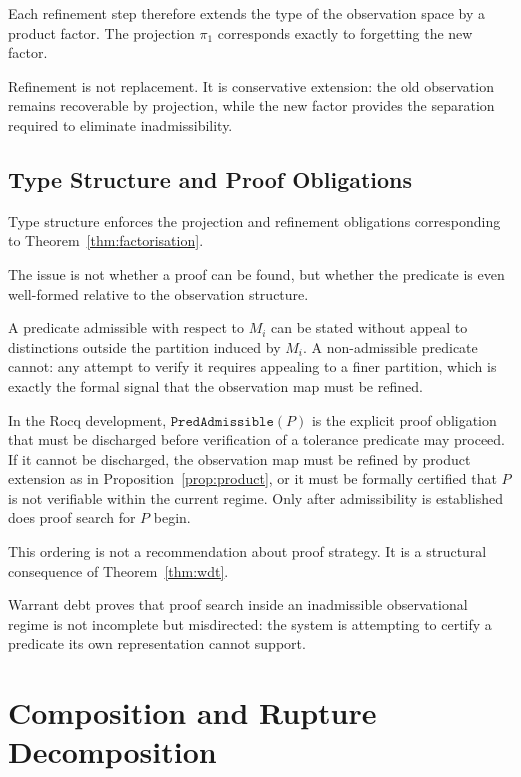 \documentclass[12pt]{article}
\theoremstyle{plain}
\theoremstyle{definition}
\theoremstyle{remark}
\begin{document}
Each refinement step therefore extends the type of the observation
space by a product factor.
The projection $\pi_1$ corresponds exactly to forgetting the new
factor.

Refinement is not replacement.
It is conservative extension: the old observation remains recoverable
by projection, while the new factor provides the separation required
to eliminate inadmissibility.

\subsection{Type Structure and Proof Obligations}

Type structure enforces the projection and refinement obligations
corresponding to Theorem~\ref{thm:factorisation}.

The issue is not whether a proof can be found, but whether the
predicate is even well-formed relative to the observation structure.

A predicate admissible with respect to $M_i$ can be stated without
appeal to distinctions outside the partition induced by $M_i$.
A non-admissible predicate cannot: any attempt to verify it requires
appealing to a finer partition, which is exactly the formal signal that
the observation map must be refined.

In the Rocq development, $\mathtt{PredAdmissible}(P)$ is the explicit
proof obligation that must be discharged before verification of a
tolerance predicate may proceed.
If it cannot be discharged, the observation map must be refined by
product extension as in Proposition~\ref{prop:product}, or it must be
formally certified that $P$ is not verifiable within the current
regime.
Only after admissibility is established does proof search for $P$
begin.

This ordering is not a recommendation about proof strategy.
It is a structural consequence of Theorem~\ref{thm:wdt}.

Warrant debt proves that proof search inside an inadmissible
observational regime is not incomplete but misdirected: the system is
attempting to certify a predicate its own representation cannot
support.

\section{Composition and Rupture Decomposition}
\label{sec:composition}
\end{document}

